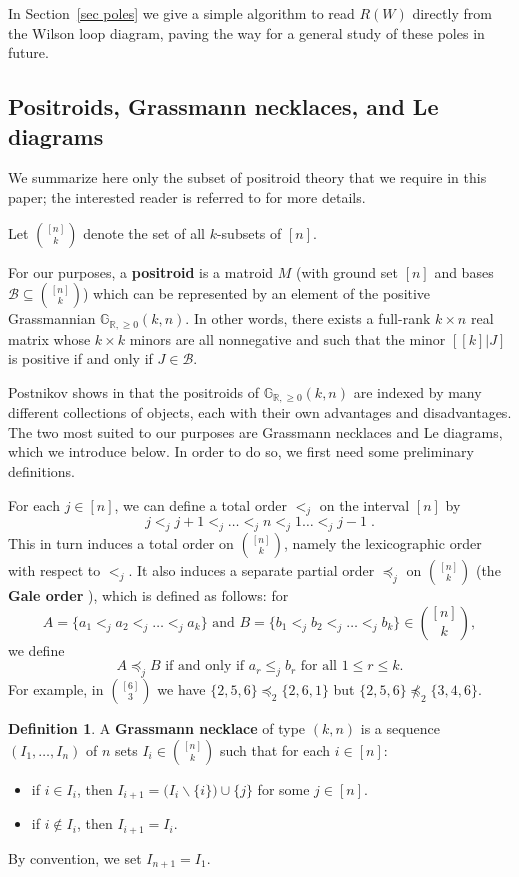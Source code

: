 \documentclass[11pt]{article}
\newcommand{\R}{\mathbb{R}}
\newcommand{\Gr}{\mathbb{G}_{\R, \geq 0}}
\newcommand{\cB}{\mathcal{B}}
\newcommand{\gale}[1]{\preccurlyeq_{#1}}
\theoremstyle{remark}
\theoremstyle{definition}
\newtheorem{dfn}[thm]{Definition}
\begin{document}
In Section~\ref{sec poles} we give a simple algorithm to read $R(W)$ directly from the Wilson loop diagram, paving the way for a general study of these poles in future.


\subsection{Positroids, Grassmann necklaces, and Le diagrams}\label{sec:positroid background}

We summarize here only the subset of positroid theory that we require in this paper; the interested reader is referred to \cite{Postnikov} for more details. 

Let $\binom{[n]}{k}$ denote the set of all $k$-subsets of $[n]$.  

For our purposes, a {\bf positroid} is a matroid $M$ (with ground set $[n]$ and bases $\cB \subseteq \binom{[n]}{k}$) which can be represented by an element of the positive Grassmannian $\Gr(k,n)$. In other words, there exists a full-rank $k\times n$ real matrix whose $k\times k$ minors are all nonnegative and such that the minor $[[k]|J]$ is positive if and only if $J \in \cB$.

Postnikov shows in \cite{Postnikov} that the positroids of $\Gr(k,n)$ are indexed by many different collections of objects, each with their own advantages and disadvantages. The two most suited to our purposes are Grassmann necklaces and Le diagrams, which we introduce below. In order to do so, we first need some preliminary definitions.

For each $j \in [n]$, we can define a total order $<_j$ on the interval $[n]$ by
\[ j <_j j+1 <_j \dots <_j n <_j 1 \dots <_j j-1\;.\]
This in turn induces a total order on $\binom{[n]}{k}$, namely the lexicographic order with respect to $<_j$.  It also induces a separate partial order $\gale{j}$ on $\binom{[n]}{k}$ (the {\bf Gale order} \cite{Gale}), which is defined as follows: for 
\[A = \{a_1 <_j a_2 <_j \dots <_j a_k\} \text{ and } B = \{b_1 <_j b_2 <_j \dots <_j b_k\} \in \binom{[n]}{k},\] we define
\[A \gale{j} B \text{ if and only if } a_r \leq_j b_r \text{ for all }1 \leq r \leq k.\]
For example, in $\binom{[6]}{3}$ we have $\{2,5,6\}\gale{2} \{2,6,1\}$ but $\{2,5,6\}\not\gale{2}\{3,4,6\}$.


\begin{dfn}\label{def:grassmann necklace}
A {\bf Grassmann necklace} of type $(k,n)$ is a sequence $(I_1, \dots, I_n)$ of $n$ sets $I_i \in \binom{[n]}{k}$ such that for each $i \in [n]$:
\begin{itemize}
\item if $i \in I_i$, then $I_{i+1} = \big(I_i \backslash \{i\}\big) \cup \{j\}$ for some $j \in[n]$.
\item if $i \not\in I_i$, then $I_{i+1} = I_i$.
\end{itemize}
By convention, we set $I_{n+1} = I_1$.
\end{dfn}
\end{document}

